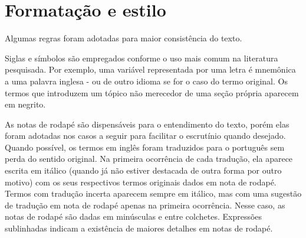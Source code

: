 \chapter{Formatação e estilo}\label{estilo}
Algumas regras foram adotadas para maior consistência do texto.

Siglas e símbolos são empregados conforme o uso mais comum na literatura pesquisada.
Por exemplo, uma variável representada por uma letra é mnemônica a uma palavra inglesa - ou de outro idioma se for o caso do termo original.
Os termos que introduzem um tópico não merecedor de uma seção própria aparecem em negrito.

As notas de rodapé são dispensáveis para o entendimento do texto, porém elas foram adotadas nos casos a seguir para facilitar o escrutínio quando desejado.
Quando possível, os termos em inglês foram traduzidos para o português sem perda do sentido original.
Na primeira ocorrência de cada tradução, ela aparece escrita em itálico (quando já não estiver destacada de outra forma por outro motivo) com os seus respectivos termos originais dados em nota de rodapé.
Termos com tradução incerta aparecem sempre em itálico, mas com uma sugestão de tradução em nota de rodapé apenas na primeira ocorrência.
Nesse caso, as notas de rodapé são dadas em minúsculas e entre colchetes.
Expressões sublinhadas indicam a existência de maiores detalhes em notas de rodapé.
%